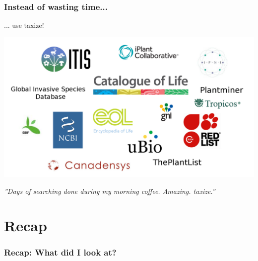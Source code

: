 \documentclass[
	10pt
	]{beamer}
\begin{document}
{%
\begin{frame}
\frametitle{Instead of wasting time...}
	... use \alert{taxize!} \\
		\hspace*{-2cm}
		\begin{center}
		\includegraphics[height=0.6\textheight]{figs/sources_taxize.png}
		\end{center}

	\pause
	\emph{''Days of searching done during my morning coffee. Amazing. \alert{taxize}.''}
\end{frame}
}




\section*{Recap}

\begin{frame}
\frametitle{Recap: What did I look at?}
 \resizebox{11.5cm}{!}{%
				
				}
\end{frame}
\end{document}
